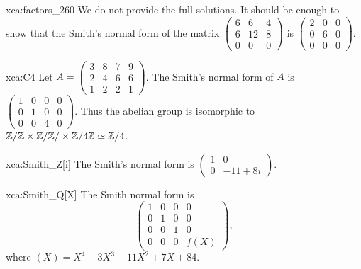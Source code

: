 \begin{sol}{xca:factors_260}
	We do not provide the full solutions. It should be enough to
	show that the Smith's normal form
	of the matrix $\begin{pmatrix}
		6 & 6 & 4\\
		6 & 12 & 8\\
		0 & 0 & 0
	\end{pmatrix}$ is $\begin{pmatrix}
		2 & 0 & 0\\
		0 & 6 & 0\\
		0 & 0 & 0
	\end{pmatrix}$. 
\end{sol}

\begin{sol}{xca:C4}
    Let $A=\begin{pmatrix}
    3 & 8 & 7 & 9\\
    2 & 4 & 6 & 6\\
    1 & 2 & 2 & 1
    \end{pmatrix}$.  
    The Smith's normal form of $A$  
    is $\begin{pmatrix}
        1 & 0 & 0 & 0\\
        0 & 1 & 0 & 0\\
        0 & 0 & 4 & 0
    \end{pmatrix}$. Thus the abelian group is isomorphic to $\mathbb{Z}/\mathbb{Z}\times\mathbb{Z}/\mathbb{Z}/\times\mathbb{Z}/4\mathbb{Z}\simeq\mathbb{Z}/4$.  
\end{sol}

\begin{sol}{xca:Smith_Z[i]}
	The Smith's normal form is $\begin{pmatrix}
		1 & 0\\
		0 & -11+8i
	\end{pmatrix}$. 
\end{sol}

\begin{sol}{xca:Smith_Q[X]}
	The Smith normal form is 
	\[
		\begin{pmatrix}
			1 & 0 & 0 & 0 \\
			0 & 1 & 0 & 0 \\
			0 & 0 & 1 & 0 \\
			0 & 0 & 0 & f(X)
		\end{pmatrix},
	\]
	where $(X)=X^4 - 3 X^3 - 11 X^2 + 7X + 84$. 
\end{sol}

